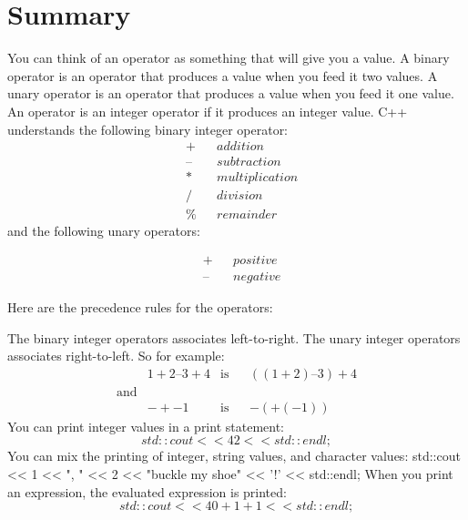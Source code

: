 \newpage\section{Summary}

You can think of an operator as something that will give you a value.
A binary operator is an operator that produces a value when you feed it
two values.
A unary operator is an operator that produces a value when you feed it
one value.
An operator is an integer operator if it produces an integer value.
C++ understands the following binary integer operator:
\begin{align*}
&+ & &addition\\
&– & &subtraction\\
&* & &multiplication\\
&/ & &division\\
&\% & &remainder
\end{align*}
and the following unary operators:

\begin{align*}
&+ & &positive\\
&– & &negative
\end{align*}

Here are the precedence rules for the operators:

\noindent{}
The binary integer operators associates left-to-right. The unary integer
operators associates right-to-left. So for example:
\begin{align*}
&1+2–3+4 &\text{is} & &((1 + 2) – 3) + 4\\
\text{and}\\
&-+-1 &\text{is} & &-(+(-1))
\end{align*}
You can print integer values in a print statement:
\[std::cout << 42 << std::endl;\]
You can mix the printing of integer, string values, and character values:
std::cout << 1 << ", " << 2 << "buckle my shoe"
<< '!' << std::endl;
When you print an expression, the evaluated expression is printed:
\[std::cout << 40 + 1 + 1 << std::endl;\]
